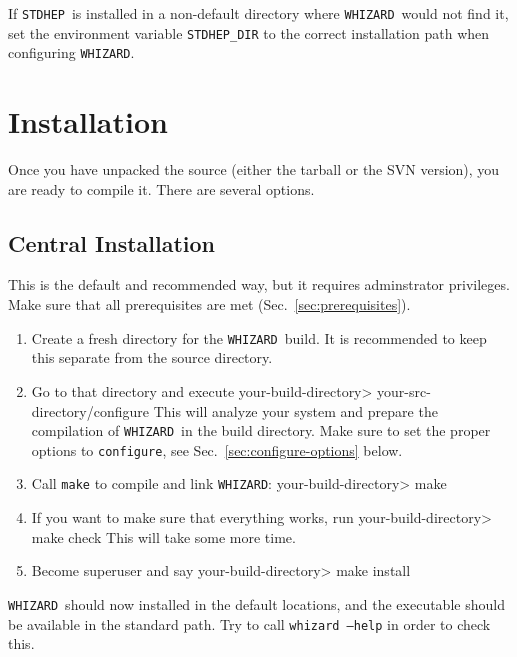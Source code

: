 \documentclass[12pt]{book}
\newenvironment{interaction}%
  {\begingroup\small
   \verbatim}%
  {\endverbatim
   \endgroup\noindent}
\newcommand{\ttt}[1]{\texttt{#1}}
\newcommand{\whizard}{\texttt{WHIZARD}}
\newcommand{\stdhep}{\texttt{STDHEP}}
\begin{document}
If \stdhep\ is installed in a non-default directory where
\whizard\ would not find it, set the environment variable
\ttt{STDHEP\_DIR} to the correct installation path when configuring
\whizard.


\section{Installation}
\label{sec:installation}

Once you have unpacked the source (either the tarball or the SVN
version), you are ready to compile it.  There are several options.


\subsection{Central Installation}
This is the default and recommended way, but it requires adminstrator
privileges.  Make sure that all
prerequisites are met (Sec.~\ref{sec:prerequisites}).
\begin{enumerate}
\item
  Create a fresh directory for the \whizard\ build.  It is recommended
  to keep this separate from the source directory.
\item
  Go to that directory and execute
  \begin{interaction}
    your-build-directory> your-src-directory/configure
  \end{interaction}
  This will analyze your system and prepare the compilation of \whizard\
  in the build directory.  Make sure to set the proper options to
  \ttt{configure}, see Sec.~\ref{sec:configure-options} below.
\item
  Call \ttt{make} to compile and link \whizard:
  \begin{interaction}
    your-build-directory> make
  \end{interaction}
\item
  If you want to make sure that everything works, run
  \begin{interaction}
    your-build-directory> make check
  \end{interaction}
  This will take some more time.
\item
  Become superuser and say
  \begin{interaction}
    your-build-directory> make install
  \end{interaction}
\end{enumerate}
\whizard\ should now installed in the default locations, and the
executable should be available in the standard path.  Try to call
\ttt{whizard --help} in order to check this.
\end{document}
